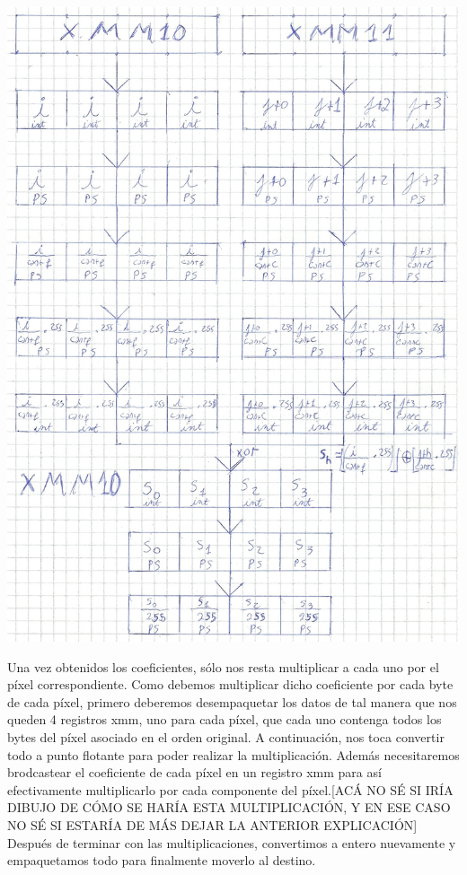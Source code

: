 \documentclass[a4paper]{article}
\begin{document}
\begin{center}
\includegraphics[scale=0.75]{Dibujos/S1.jpg}
\end{center}

Una vez obtenidos los coeficientes, sólo nos resta multiplicar a cada uno por el píxel correspondiente. Como debemos multiplicar dicho coeficiente por cada byte de cada píxel, primero deberemos desempaquetar los datos de tal manera que nos queden 4 registros xmm, uno para cada píxel, que cada uno contenga todos los bytes del píxel asociado en el orden original. A continuación, nos toca convertir todo a punto flotante para poder realizar la multiplicación. Además necesitaremos brodcastear el coeficiente de cada píxel en un registro xmm para así efectivamente multiplicarlo por cada componente del píxel.[ACÁ NO SÉ SI IRÍA DIBUJO DE CÓMO SE HARÍA ESTA MULTIPLICACIÓN, Y EN ESE CASO NO SÉ SI ESTARÍA DE MÁS DEJAR LA ANTERIOR EXPLICACIÓN] Después de terminar con las multiplicaciones, convertimos a entero nuevamente y empaquetamos todo para finalmente moverlo al destino.
\end{document}
